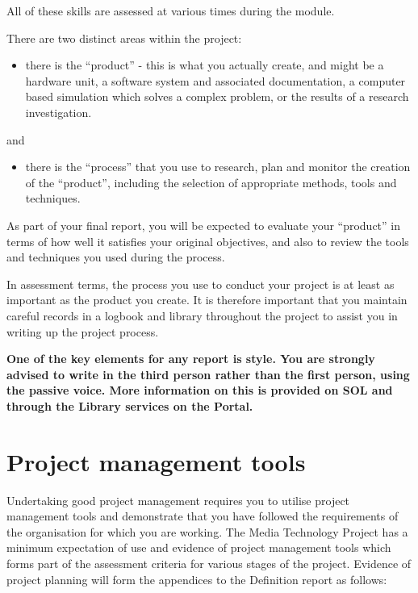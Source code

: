All of these skills are assessed at various times during the module.

There are two distinct areas within the project:

\begin{itemize}
    \item there is the “product” - this is what you actually create, and might be a hardware unit, a
    software system and associated documentation, a computer based simulation which
    solves a complex problem, or the results of a research investigation.
\end{itemize}

and

\begin{itemize}
    \item there is the “process” that you use to research, plan and monitor the creation of the
    “product”, including the selection of appropriate methods, tools and techniques.
\end{itemize}

As part of your final report, you will be expected to evaluate your “product” in terms of how well it satisfies your original objectives, and also to review the tools and techniques you used during the process.

In assessment terms, the process you use to conduct your project is at least as important as the product you create. It is therefore important that you maintain careful records in a logbook and library throughout the project to assist you in writing up the project process.

\textbf{One of the key elements for any report is style. You are strongly advised to write in the third person rather than the first person, using the passive voice. More information on this is provided on SOL and through the Library services on the Portal.}

\section*{Project management tools}

Undertaking good project management requires you to utilise project management tools and
demonstrate that you have followed the requirements of the organisation for which you are
working. The Media Technology Project has a minimum expectation of use and evidence of project
management tools which forms part of the assessment criteria for various stages of the project.
Evidence of project planning will form the appendices to the Definition report as follows:

